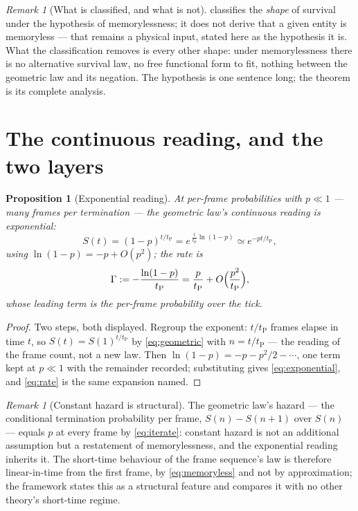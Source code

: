 \documentclass[11pt]{amsbook}
\theoremstyle{plain}
\newtheorem{proposition}[theorem]{Proposition}
\theoremstyle{definition}
\theoremstyle{remark}
\newtheorem{remark}[theorem]{Remark}
\newcommand{\uses}[1]{\par\nopagebreak\noindent{\footnotesize\emph{Uses: #1.}\par}}
\begin{document}
\begin{remark}[What is classified, and what is not]\label{rem:classification}
 classifies the \emph{shape} of survival under the hypothesis of memorylessness; it does not derive that a given entity is memoryless --- that remains a physical input, stated here as the hypothesis it is. What the classification removes is every other shape: under memorylessness there is no alternative survival law, no free functional form to fit, nothing between the geometric law and its negation. The hypothesis is one sentence long; the theorem is its complete analysis.
\end{remark}

\section{The continuous reading, and the two layers}\label{sec:continuous-decay}

\begin{proposition}[Exponential reading]\label{prop:exponential}
At per-frame probabilities with $p \ll 1$ --- many frames per termination --- the geometric law's continuous reading is exponential:
\begin{equation}\label{eq:exponential}
S(t) = (1-p)^{t/t_{\mathrm P}} = e^{\,\frac{t}{t_{\mathrm P}}\ln(1-p)} \simeq e^{-pt/t_{\mathrm P}},
\end{equation}
using $\ln(1-p) = -p + O(p^{2})$; the rate is
\begin{equation}\label{eq:rate}
\Gamma := -\frac{\ln(1-p)}{t_{\mathrm P}} = \frac{p}{t_{\mathrm P}} + O\Bigl(\frac{p^{2}}{t_{\mathrm P}}\Bigr),
\end{equation}
whose leading term is the per-frame probability over the tick.
\uses{\cref{thm:geometric}; one Taylor step}
\end{proposition}

\begin{proof}
Two steps, both displayed. Regroup the exponent: $t/t_{\mathrm P}$ frames elapse in time $t$, so $S(t) = S(1)^{t/t_{\mathrm P}}$ by \cref{eq:geometric} with $n = t/t_{\mathrm P}$ --- the reading of the frame count, not a new law. Then $\ln(1-p) = -p - p^{2}/2 - \cdots$, one term kept at $p \ll 1$ with the remainder recorded; substituting gives \cref{eq:exponential}, and \cref{eq:rate} is the same expansion named.
\end{proof}

\begin{remark}[Constant hazard is structural]\label{rem:hazard}
The geometric law's hazard --- the conditional termination probability per frame, $S(n) - S(n+1)$ over $S(n)$ --- equals $p$ at every frame by \cref{eq:iterate}: constant hazard is not an additional assumption but a restatement of memorylessness, and the exponential reading inherits it. The short-time behaviour of the frame sequence's law is therefore linear-in-time from the first frame, by \cref{eq:memoryless} and not by approximation; the framework states this as a structural feature and compares it with no other theory's short-time regime.
\end{remark}
\end{document}
